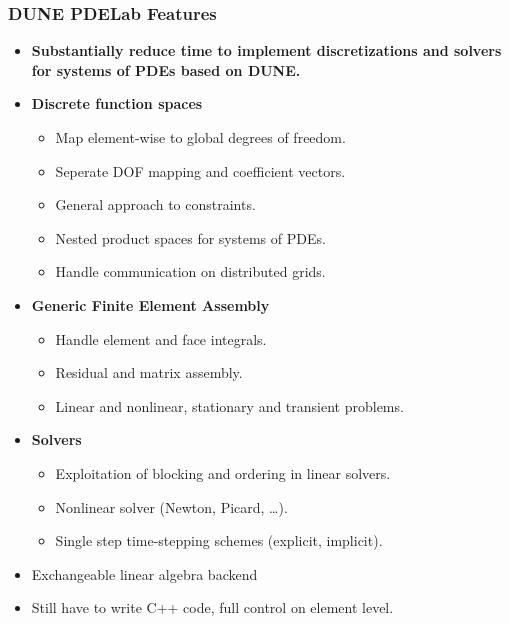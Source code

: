 \begin{frame}
\frametitle<presentation>{DUNE PDELab Features}
\begin{itemize}
\item \textbf{Substantially reduce time to implement
discretizations and solvers for systems of PDEs based on DUNE.}
\item \textbf{Discrete function spaces}
\begin{itemize}
\item Map element-wise to global degrees of freedom.
\item Seperate DOF mapping and coefficient vectors.
\item General approach to constraints.
\item Nested product spaces for systems of PDEs.
\item Handle communication on distributed grids.
\end{itemize} 
\item \textbf{Generic Finite Element Assembly}
\begin{itemize}
\item Handle element and face integrals.
\item Residual and matrix assembly.
\item Linear and nonlinear, stationary and transient problems.
\end{itemize} 
\item \textbf{Solvers}
\begin{itemize}
\item Exploitation of blocking and ordering in linear solvers.
\item Nonlinear solver (Newton, Picard, \ldots).
\item Single step time-stepping schemes (explicit, implicit).
\end{itemize} 
\item Exchangeable linear algebra backend
\item Still have to write C++ code, full control on element level.
\end{itemize}
\end{frame}

